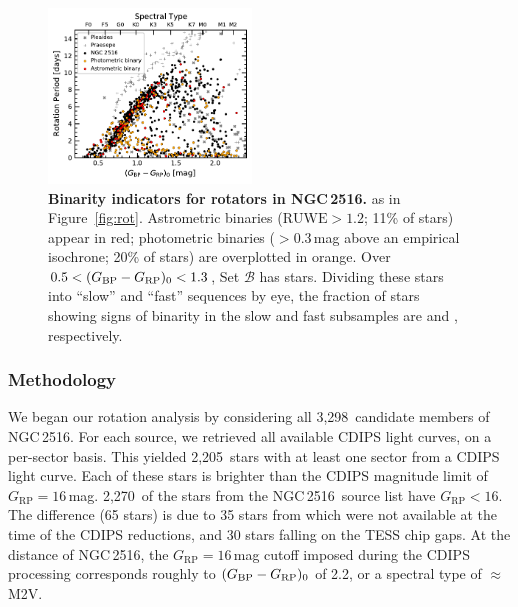 \documentclass[12pt,twocolumn,tighten]{aastex63}
\newcommand{\cn}{NGC\,2516} %
\newcommand{\nkinematic}{3{,}298} %
\newcommand{\ncdips}{2{,}205}
\newcommand{\nkinematicrpltsixteen}{2{,}270}
\newcommand{\bpmrpo}{(G_{\rm BP}-G_{\rm RP})_0}
\begin{document}
\begin{figure}[t]
	\begin{center}
		\leavevmode
		\includegraphics[width=0.480\textwidth]{f5.pdf}
	\end{center}
	\vspace{-0.7cm}
	\caption{ {\bf Binarity indicators for rotators in \cn.}  as in
		Figure~\ref{fig:rot}.  Astrometric binaries ($\mathrm{RUWE}>1.2$;
		11\% of stars) appear in red; photometric binaries ($>$0.3\,mag
		above an empirical isochrone; 20\% of stars) are overplotted in
		orange.  
		Over $0.5<\bpmrpo<1.3$, Set $\mathcal{B}$ has  stars.
		Dividing these stars into ``slow'' and ``fast'' sequences by eye,
		the fraction of stars showing signs of binarity in the slow and fast
		subsamples are  and
		, respectively.
		\label{fig:binarity}
	}
\end{figure}

\subsubsection{Methodology}
\label{subsubsec:cluster}

We began our rotation analysis by considering all \nkinematic\
candidate members of \cn.  For each source, we retrieved all available
CDIPS light curves, on a per-sector basis.  This yielded \ncdips\
stars with at least one sector from a CDIPS light curve.  Each of
these stars is brighter than the CDIPS magnitude limit of
$G_\mathrm{RP}=16$\,mag.  \nkinematicrpltsixteen\ of the stars from the \cn\
source list have $G_\mathrm{RP}<16$.  The difference (65 stars) is due to 35 stars
from \citet{meingast_2021} which were not available at the time of the
CDIPS reductions, and 30 stars falling on the TESS chip gaps.  At the
distance of \cn, the $G_\mathrm{RP}=16$\,mag cutoff imposed during the CDIPS
processing corresponds roughly to $\bpmrpo$ of 2.2, or a spectral type
of $\approx$M2V.
\end{document}
